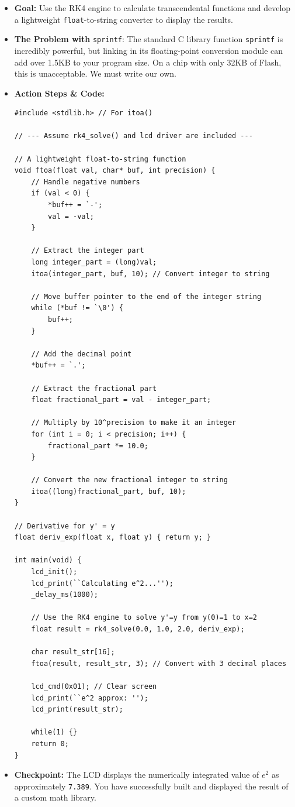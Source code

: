 \documentclass[11pt,a4paper]{article}
\begin{document}
\begin{itemize}
    \item \textbf{Goal:} Use the RK4 engine to calculate transcendental functions and develop a lightweight \verb|float|-to-string converter to display the results.
\item \textbf{The Problem with }\verb|sprintf|: The standard C library function \verb|sprintf| is incredibly powerful, but linking in its floating-point conversion module can add over 1.5KB to your program size. On a chip with only 32KB of Flash, this is unacceptable. We must write our own.
    \item \textbf{Action Steps \& Code:}
\begin{lstlisting}[caption={Code for Module 8.2: Custom Float-to-ASCII}]
#include <stdlib.h> // For itoa()

// --- Assume rk4_solve() and lcd driver are included ---

// A lightweight float-to-string function
void ftoa(float val, char* buf, int precision) {
    // Handle negative numbers
    if (val < 0) {
        *buf++ = `-';
        val = -val;
    }

    // Extract the integer part
    long integer_part = (long)val;
    itoa(integer_part, buf, 10); // Convert integer to string

    // Move buffer pointer to the end of the integer string
    while (*buf != `\0') {
        buf++;
    }
    
    // Add the decimal point
    *buf++ = `.';

    // Extract the fractional part
    float fractional_part = val - integer_part;

    // Multiply by 10^precision to make it an integer
    for (int i = 0; i < precision; i++) {
        fractional_part *= 10.0;
    }

    // Convert the new fractional integer to string
    itoa((long)fractional_part, buf, 10);
}

// Derivative for y' = y
float deriv_exp(float x, float y) { return y; }

int main(void) {
    lcd_init();
    lcd_print(``Calculating e^2...'');
    _delay_ms(1000);
    
    // Use the RK4 engine to solve y'=y from y(0)=1 to x=2
    float result = rk4_solve(0.0, 1.0, 2.0, deriv_exp);
    
    char result_str[16];
    ftoa(result, result_str, 3); // Convert with 3 decimal places

    lcd_cmd(0x01); // Clear screen
    lcd_print(``e^2 approx: '');
    lcd_print(result_str);

    while(1) {}
    return 0;
}
\end{lstlisting}
    \item \textbf{Checkpoint:} The LCD displays the numerically integrated value of $e^{2}$ as approximately \verb|7.389|. You have successfully built and displayed the result of a custom math library.
\end{itemize}
\newpage
\end{document}
